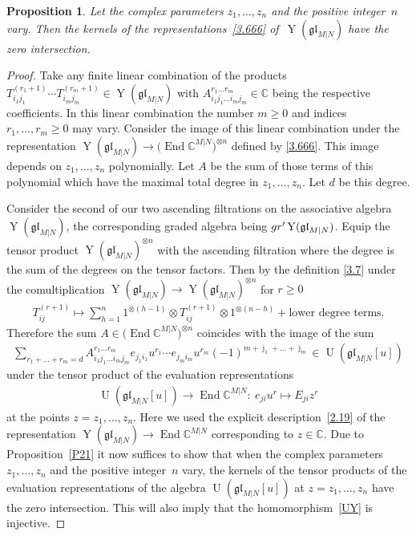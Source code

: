 \documentclass[11pt]{article}
\numberwithin{equation}{section}
\newtheorem{Proposition}[Theorem]{Proposition}
\def\bj{{\bar\jmath }}
\def\CC{{\mathbb{C}}}
\def\CMN{\CC^{M|N}}
\def\End{\operatorname{End}}
\def\g{\glMN [u]}
\def\ge{\geqslant}
\def\glMN{\mathfrak{gl}_{M|N}}
\def\grpr{{\rm gr}^{\prime} }
\def\ot{\otimes}
\def\Ug{\operatorname{U}(\g)}
\def\YMN{\operatorname{Y}(\glMN)}
\begin{document}
\begin{Proposition}\label{P22}
Let the complex parameters $z_1,\dots, z_n$ and the positive integer~$n$ vary.
Then the kernels of the representations~\eqref{3.666} of~$\YMN$
have the zero intersection.
\end{Proposition}

\begin{proof}Take any finite linear combination of the products
$T_{i_1j_1}^{(r_1+1)}\cdots T_{i_mj_m}^{(r_m+1)}\in\YMN$ with
$
A_{i_1j_1\dots i_mj_m}^{r_1\dots r_m}\in\CC
$
being the respective coefficients.
In this linear combination the number $m\ge0$ and
indices $r_1,\dots, r_m\ge0$ may vary.
Consider the image of this linear combination
under the representation
$\YMN\to\big(\End\CMN\big)^{\ot n}$ defined by \eqref{3.666}.
This image depends on $z_1,\dots, z_n$ polynomially.
Let $A$ be the sum of those terms of
this polynomial which have the maximal total degree in $z_1,\dots, z_n $.
Let $d$ be this degree.

Consider the second of our two ascending filtrations
on the associative algebra $\YMN $,
the corresponding graded algebra being $\grpr\YMN $.
Equip the tensor product $\YMN^{\ot n}$ with the ascending
filtration where the degree is the sum of the degrees on the tensor factors.
Then by the definition \eqref{3.7}
under the comultiplication $\YMN\to\YMN^{\ot n}$ for $r\ge0$
\begin{gather*}
T_{ij}^{(r+1)}\mapsto
\sum_{h=1}^n
1^{\ot (h-1)}\ot T_{ij}^{(r+1)}\ot1^{\ot (n-h)}
 +
\text{lower degree terms.}
\end{gather*}
Therefore the sum $A\in\big(\End\CMN\big)^{\ot n}$
coincides with the image of the sum
\begin{gather*}
\sum_{r_1+\dots+r_m= d}
A_{i_1j_1\dots i_mj_m}^{r_1\dots r_m}
e_{j_1i_1} u^{r_1}\cdots e_{j_mi_m} u^{r_m}
(-1)^{m + \bj_1 + \dots + \bj_m}\in\Ug
\end{gather*}
under the tensor product of the evaluation representations
\begin{gather}\label{evalrep}
\Ug\to\End\CMN\colon \
e_{ji} u^{r}
\mapsto
E_{ji} z^{r}
\end{gather}
at the points $z=z_1,\dots, z_n $. Here we used the explicit
description~\eqref{2.19}
of the representation $\YMN\to\End\CMN$ corresponding to $z\in\CC $.
Due to Proposition~\ref{P21} it now
suffices to show that when the complex parameters $z_1,\dots, z_n$
and the positive integer~$n$ vary, the kernels
of the tensor products
of the evaluation representations
of the algebra $\Ug$ at $z=z_1,\dots, z_n$
have the zero intersection.
This will also imply that the homomorphism~\eqref{UY} is injective.


\end{proof}
\end{document}
